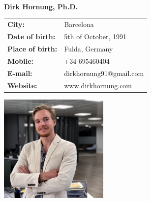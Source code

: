 \documentclass[11pt]{article}
\begin{document}
\Large
\noindent
\textbf{Dirk Hornung, Ph.D.} \\

\normalsize
\noindent
\begin{minipage}{0.5\linewidth}
  \begin{tabularx}{0.6\textwidth}{>{\bfseries}l l}
    City:           & Barcelona \\
    Date of birth:  & 5th of October, 1991\\
    Place of birth: & Fulda, Germany \\
    Mobile:         & +34 695460404 \\
    E-mail:         & dirkhornung91@gmail.com \\
    Website:      	& www.dirkhornung.com
  \end{tabularx}
\end{minipage}
\begin{minipage}{0.5\linewidth}
  \begin{flushright}
    \includegraphics[width=0.4\textwidth]{dirk.png}
  \end{flushright}
\end{minipage}


\end{document}
